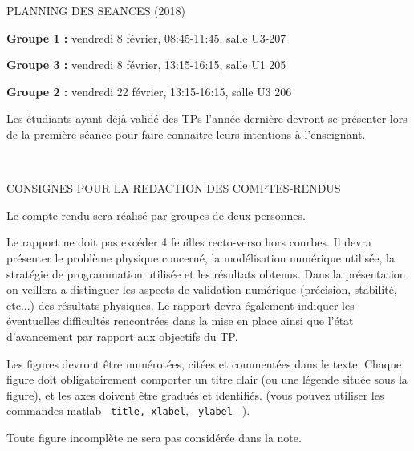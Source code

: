 \documentclass[a4,12pt]{article}
\begin{document}
\begin{enumerate}
\selectfont
{}\selectfont




\noindent 

\begin{center}
{\Large PLANNING DES SEANCES (2018)}
\end{center}
\noindent


{\bf Groupe 1 :} vendredi 8 février, 08:45-11:45, salle U3-207 

{\bf Groupe 3 :} vendredi 8 février, 13:15-16:15, salle U1 205 

{\bf Groupe 2 :} vendredi 22 février, 13:15-16:15, salle U3 206

\noindent
Les étudiants ayant déjà validé des TPs l'année dernière devront se présenter lors de la première séance pour faire connaitre leurs intentions à l'enseignant.



\clearpage



~\\
\begin{center}
{\Large CONSIGNES POUR LA REDACTION DES COMPTES-RENDUS}
\end{center}
\noindent
Le compte-rendu sera réalisé par groupes de deux personnes.

\noindent
Le rapport ne doit pas excéder 4 feuilles recto-verso hors courbes. 
Il devra présenter le problème physique concerné, la modélisation numérique utilisée, 
la stratégie de programmation utilisée et les résultats obtenus. Dans la présentation on  veillera a distinguer les aspects de validation numérique (précision, stabilité, etc...) des résultats physiques. 
Le rapport devra également indiquer les éventuelles difficultés rencontrées dans la mise en place ainsi que l'état d'avancement par rapport aux objectifs du TP. 
 
\noindent
 Les figures devront \^etre numérotées, citées et commentées dans le texte. Chaque figure doit obligatoirement comporter un titre clair (ou une légende située sous la figure), et les axes doivent être gradués et identifiés. (vous pouvez utiliser les commandes matlab \verb| title, xlabel|,
 \verb| ylabel | ).

Toute figure incomplète ne sera pas considérée dans la note.


\end{enumerate}
\end{document}
